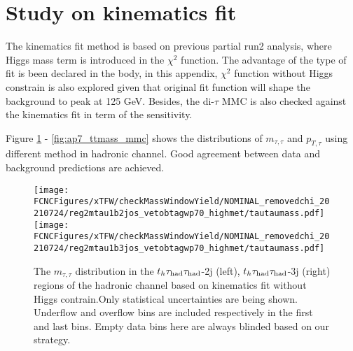 \section{Study on kinematics fit}
\label{sec:kine}

The kinematics fit method is based on previous partial run2 analysis, where Higgs mass term is introduced in the $\chi^2$ function. 
The advantage of the type of fit is been declared in the body, in this appendix, $\chi^2$ function without Higgs constrain is also explored given that original fit function
will shape the background to peak at 125 GeV. Besides, the di-$\tau$ MMC is also checked against the kinematics fit in term of the sensitivity.

Figure \ref{fig:ap7_ttmass_removedchi2} - \ref{fig:ap7_ttmass_mmc} shows the distributions of $m_{\tau,\tau}$ and $p_{T,\tau}$ using different method in hadronic channel. Good agreement between data and background predictions are achieved.




\begin{figure}[H]
\centering
\texttt{[image: \\FCNCFigures/xTFW/checkMassWindowYield/NOMINAL\_removedchi\_20210724/reg2mtau1b2jos\_vetobtagwp70\_highmet/tautaumass.pdf]}
\texttt{[image: \\FCNCFigures/xTFW/checkMassWindowYield/NOMINAL\_removedchi\_20210724/reg2mtau1b3jos\_vetobtagwp70\_highmet/tautaumass.pdf]}
\caption{ The $m_{\tau,\tau}$ distribution in the $t_h\tau_\text{had}{}\tau_\text{had}$-2j (left), $t_h\tau_\text{had}{}\tau_\text{had}$-3j (right) regions of the hadronic channel based on kinematics fit without Higgs contrain.Only statistical uncertainties are being shown. Underflow and overflow bins are included respectively in the first and last bins. Empty data bins here are always blinded based on our strategy.}
\label{fig:ap7_ttmass_removedchi2}
\end{figure}

